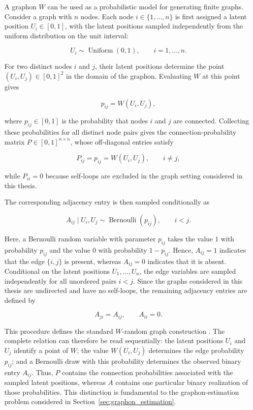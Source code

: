 A graphon \(W\) can be used as a probabilistic model for generating finite graphs. Consider a graph with \(n\) nodes. Each node \(i\in\{1,\ldots,n\}\) is first assigned a latent position \(U_i\in[0,1]\), with the latent positions sampled independently from the uniform distribution on the unit interval:

\[
U_i\sim\operatorname{Uniform}(0,1),
\qquad i=1,\ldots,n.
\]

For two distinct nodes \(i\) and \(j\), their latent positions determine the point
\((U_i,U_j)\in[0,1]^2\) in the domain of the graphon. Evaluating \(W\) at this point gives

\[
p_{ij}=W(U_i,U_j),
\]

where \(p_{ij}\in[0,1]\) is the probability that nodes \(i\) and \(j\) are connected. Collecting these probabilities for all distinct node pairs gives the connection-probability matrix \(P\in[0,1]^{n\times n}\), whose off-diagonal entries satisfy

\[
P_{ij}=p_{ij}=W(U_i,U_j),
\qquad i\neq j,
\]

while \(P_{ii}=0\) because self-loops are excluded in the graph setting considered in this thesis.

The corresponding adjacency entry is then sampled conditionally as

\[
A_{ij}\mid U_i,U_j
\sim
\operatorname{Bernoulli}(p_{ij}),
\qquad i<j.
\]

Here, a Bernoulli random variable with parameter \(p_{ij}\) takes the value \(1\) with probability \(p_{ij}\) and the value \(0\) with probability \(1-p_{ij}\). Hence, \(A_{ij}=1\) indicates that the edge \(\{i,j\}\) is present, whereas \(A_{ij}=0\) indicates that it is absent. Conditional on the latent positions \(U_1,\ldots,U_n\), the edge variables are sampled independently for all unordered pairs \(i<j\). Since the graphs considered in this thesis are undirected and have no self-loops, the remaining adjacency entries are defined by

\[
A_{ji}=A_{ij},
\qquad
A_{ii}=0.
\]

This procedure defines the standard \(W\)-random graph construction \cite{lovasz2006limits}. The complete relation can therefore be read sequentially: the latent positions \(U_i\) and \(U_j\) identify a point of \(W\); the value \(W(U_i,U_j)\) determines the edge probability \(p_{ij}\); and a Bernoulli draw with this probability determines the observed binary entry \(A_{ij}\). Thus, \(P\) contains the connection probabilities associated with the sampled latent positions, whereas \(A\) contains one particular binary realization of those probabilities. This distinction is fundamental to the graphon-estimation problem considered in Section~\ref{sec:graphon_estimation}.


